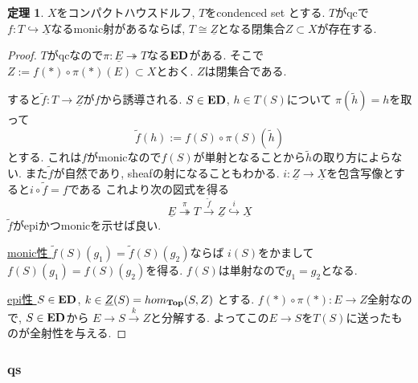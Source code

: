 \documentclass[dvipdfmx,a4paper,11pt]{article}
\theoremstyle{definition}
\newtheorem{thm}{定理}
\begin{document}
  \begin{tcolorbox}
 [colback = white, colframe = green!35!black, fonttitle = \bfseries,breakable = true]
 \begin{thm}\cite[Proposition 4.12.3]{Bar22}
 \label{thm-qs-monic}
$X$をコンパクトハウスドルフ, $T$をcondenced set とする.
$T$がqcで$f : T \hookrightarrow \underline{X}$なるmonic射があるならば, 
$T  \cong \underline{Z}$となる閉集合$Z \subset X$が存在する. 
 \end{thm}
 \end{tcolorbox}
 \begin{proof}
 $T$がqcなので$\pi : \underline{E} \twoheadrightarrow T$なる${\bf  ED}$がある. 
 そこで$Z:= f(\ast)\circ{\pi(\ast)}(E)  \subset X$とおく. 
 $Z$は閉集合である.
 
すると$\widetilde{f} : T \to \underline{Z}$が$f$から誘導される.
$S \in {\bf ED}$, $h \in T(S)$について
$\pi(\widetilde{h}) = h$を取って
$$
\widetilde{f}(h):= f(S) \circ \pi(S)(\widetilde{h})
$$
とする.
これは$f$がmonicなので$f(S)$が単射となることから$\widetilde{h}$の取り方によらない.
また$\widetilde{f}$が自然であり, sheafの射になることもわかる. 
$i : \underline{Z} \to \underline{X}$を包含写像とすると$i \circ \widetilde{f} = f$である
 これより次の図式を得る
 $$
 \underline{E} \overset{\pi}{\twoheadrightarrow}
 T \overset{\widetilde{f}}{\to}
  \underline{Z} \overset{i}{\hookrightarrow}
  \underline{X}
 $$
 $\widetilde{f}$がepiかつmonicを示せば良い.
 
 \underline{monic性 }$\widetilde{f}(S)(g_1) = \widetilde{f}(S)(g_2)$ならば
$i(S)$をかまして$f(S)(g_1) = f(S)(g_2)$を得る. $f(S)$は単射なので$g_1 = g_2$となる.

 \underline{epi性 } $S \in {\bf ED}$, $k \in \underline{Z}(S) = hom_{{\bf Top}}(S, Z)$
とする. $f(\ast)\circ{\pi(\ast)} : E \to Z$全射なので, $S \in {\bf ED}$から
$E \to S \overset{k}{\to} Z$と分解する. 
よってこの$E\to S$を$T(S)$に送ったものが全射性を与える.

 \end{proof}

 
 \subsubsection{qs}
 
\end{document}
